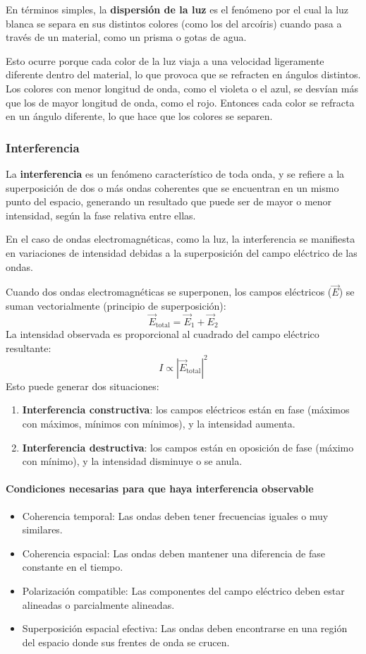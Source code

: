 En términos simples, la \textbf{dispersión de la luz} es el fenómeno por el cual la luz blanca se separa en sus distintos colores (como los del arcoíris) cuando pasa a través de un material, como un prisma o gotas de agua.

Esto ocurre porque cada color de la luz viaja a una velocidad ligeramente diferente dentro del material, lo que provoca que se refracten en ángulos distintos. Los colores con menor longitud de onda, como el violeta o el azul, se desvían más que los de mayor longitud de onda, como el rojo. Entonces cada color se refracta en un ángulo diferente, lo que hace que los colores se separen.

\subsubsection{Interferencia}

La \textbf{interferencia} es un fenómeno característico de toda onda, y se refiere a la superposición de dos o más ondas coherentes que se encuentran en un mismo punto del espacio, generando un resultado que puede ser de mayor o menor intensidad, según la fase relativa entre ellas.

En el caso de ondas electromagnéticas, como la luz, la interferencia se manifiesta en variaciones de intensidad debidas a la superposición del campo eléctrico de las ondas.

Cuando dos ondas electromagnéticas se superponen, los campos eléctricos (\(\vec{E}\)) se suman vectorialmente (principio de superposición):
\[
\vec{E}_{\text{total}} = \vec{E}_1 + \vec{E}_2
\]
La intensidad observada es proporcional al cuadrado del campo eléctrico resultante:
\[
I \propto |\vec{E}_{\text{total}}|^2
\]
Esto puede generar dos situaciones:
\begin{enumerate}
  \item \textbf{Interferencia constructiva}: los campos eléctricos están en fase (máximos con máximos, mínimos con mínimos), y la intensidad aumenta.
  \item \textbf{Interferencia destructiva}: los campos están en oposición de fase (máximo con mínimo), y la intensidad disminuye o se anula.
\end{enumerate}

\paragraph{Condiciones necesarias para que haya interferencia observable}
\begin{itemize}
  \item Coherencia temporal: Las ondas deben tener frecuencias iguales o muy similares.
  \item Coherencia espacial: Las ondas deben mantener una diferencia de fase constante en el tiempo.
  \item Polarización compatible: Las componentes del campo eléctrico deben estar alineadas o parcialmente alineadas.
  \item Superposición espacial efectiva: Las ondas deben encontrarse en una región del espacio donde sus frentes de onda se crucen.
\end{itemize}

